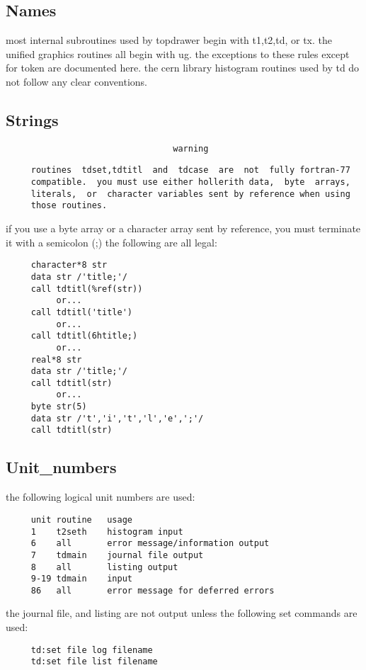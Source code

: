 \subsection{Names}
most  internal  subroutines used by topdrawer begin with t1,t2,td, or tx.
the unified graphics routines all begin with ug.  the exceptions to these
rules  except  for token are documented here.  the cern library histogram
routines used by td do not follow any clear conventions.  
\subsection{Strings}


\begin{verbatim}
                                 warning
\end{verbatim}

\begin{verbatim}
     routines  tdset,tdtitl  and  tdcase  are  not  fully fortran-77
     compatible.  you must use either hollerith data,  byte  arrays,
     literals,  or  character variables sent by reference when using
     those routines.  
\end{verbatim}


if  you use a byte array or a character array sent by reference, you must
terminate it with a semicolon (;) the following are all legal:  
\begin{verbatim}
     character*8 str 
     data str /'title;'/ 
     call tdtitl(%ref(str)) 
          or...  
     call tdtitl('title') 
          or...  
     call tdtitl(6htitle;) 
          or...  
     real*8 str 
     data str /'title;'/ 
     call tdtitl(str) 
          or...  
     byte str(5) 
     data str /'t','i','t','l','e',';'/ 
     call tdtitl(str) 
\end{verbatim}
\subsection{Unit\_numbers}
the following logical unit numbers are used:  
\begin{verbatim}
     unit routine   usage
     1    t2seth    histogram input
     6    all       error message/information output
     7    tdmain    journal file output
     8    all       listing output
     9-19 tdmain    input
     86   all       error message for deferred errors
\end{verbatim}
the  journal  file,  and  listing are not output unless the following set
commands are used:  
\begin{verbatim}
     td:set file log filename 
     td:set file list filename 
\end{verbatim}

